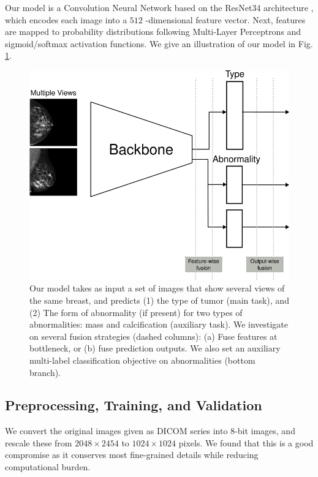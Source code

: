 \documentclass[11pt]{article}
\begin{document}
Our model is a Convolution Neural Network based on the ResNet34
architecture \autocite{he15}, which encodes each image into a \(512\) -dimensional feature
vector.
Next, features are mapped to probability distributions following Multi-Layer Perceptrons
and sigmoid/softmax activation functions.
We give an illustration of our model in Fig. \ref{fig:model}.

\begin{figure}[htbp]
\centering
\includegraphics[width=.9\linewidth]{./images/model.png}
\caption{\label{fig:model}Our model takes as input a set of images that show several views of the same breast, and predicts (1) the type of tumor (main task), and (2) The form of abnormality (if present) for two types of abnormalities: mass and calcification (auxiliary task). We investigate on several fusion strategies (dashed columns): (a) Fuse features at bottleneck, or (b) fuse prediction outputs. We also set an auxiliary multi-label classification objective on abnormalities (bottom branch).}
\end{figure}

\subsection{Preprocessing, Training, and Validation}
\label{sec:org0f22a3e}

We convert the original images given as DICOM series into 8-bit images,
and rescale these from \(2048 \times 2454\) to \(1024 \times 1024\) pixels. We found that this
is a good compromise as it conserves most fine-grained details while
reducing computational burden.
\end{document}
